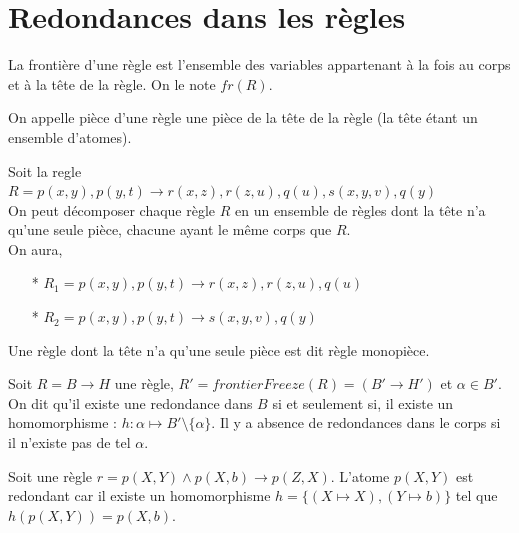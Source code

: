 \section{Redondances dans les règles}\label{sec:regles}

\begin{definition}[frontière]
La frontière d'une règle est l'ensemble des variables appartenant à la fois au corps et à la tête de la règle. On le note $fr(R)$.
\end{definition}\label{def:frontier}

\begin{definition}
    On appelle pièce d’une règle une pièce de la tête de la règle (la tête étant un ensemble d'atomes).
\end{definition}

\begin{example}
   Soit la regle $R= p(x, y),p(y, t) \rightarrow r(x,z),r(z,u),q(u),s(x, y, v), q(y)$\\
    On peut décomposer chaque règle $R$ en un ensemble de règles dont la tête n’a qu’une seule pièce, chacune ayant le même corps que $R$. \\On aura,
    \begin{itemize}
        \item[*]$R_1= p(x, y),p(y, t) \rightarrow r(x,z),r(z,u),q(u)$
      \item[*]$R_2= p(x, y),p(y, t) \rightarrow s(x, y, v), q(y)$
    \end{itemize}
    Une règle  dont la tête n’a qu’une seule pièce est dit règle monopièce.
\end{example}

\begin{definition}\label{def:body_redundancy}
    Soit $R = B \rightarrow H$ une règle, $R' = frontierFreeze(R) = (B' \rightarrow H')$ et $\alpha \in B'$. On dit qu'il existe une redondance dans $B$ si et seulement si, il existe un homomorphisme : $h : \alpha \mapsto B'\setminus\{\alpha\}$. 
    Il y a absence de redondances dans le corps si il n'existe pas de tel $\alpha$.
\end{definition}

\begin{example}
    Soit une règle $r = p(X,Y) \land p(X,b) \rightarrow p(Z,X)$. L'atome $p(X,Y)$ est redondant car il existe un homomorphisme $h = \{(X \mapsto X), (Y \mapsto b)\}$ tel que $h(p(X,Y)) = p(X,b)$.
\end{example}

